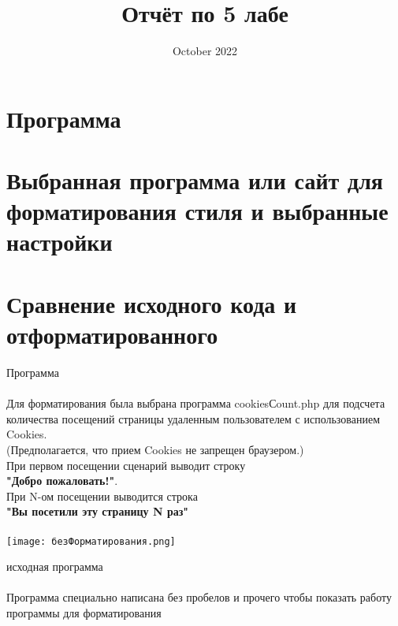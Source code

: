 \documentclass{article}
\title{Отчёт по 5 лабе}
\date{October 2022}
\begin{document}
\maketitle

\section{Программа}
\section{Выбранная программа или сайт для форматирования стиля и выбранные настройки}
\section{Сравнение исходного кода и отформатированного}

\newpage
\huge {Программа} \\ \\
\Large{Для форматирования была выбрана программа cookiesСount.php для подсчета количества посещений страницы удаленным пользователем с использованием Cookies. \\ (Предполагается, что прием Cookies не запрещен браузером.) \\ При первом посещении сценарий выводит строку \\ \textbf{"Добро пожаловать!"}. \\ При N-ом посещении выводится строка \\ \textbf{"Вы посетили эту страницу N раз"}}
\\ \\

\texttt{[image: безФорматирования.png]}

исходная программа
 \\ \\
\Large{Программа специально написана без пробелов и прочего чтобы показать работу программы для форматирования}
\end{document}

